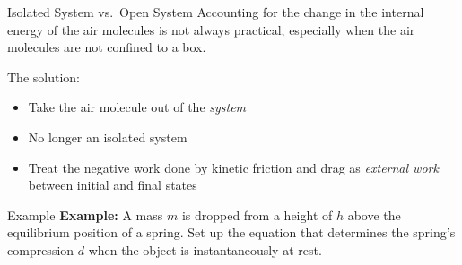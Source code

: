 \documentclass[12pt,compress,aspectratio=169]{beamer}
\begin{document}
\begin{frame}{Isolated System vs.\ Open System}
  Accounting for the change in the internal energy of the air molecules is not
  always practical, especially when the air molecules are not confined to a box.
  \begin{center}
  \end{center}
  The solution:
  \begin{itemize}
  \item Take the air molecule out of the \emph{system}
  \item No longer an isolated system
  \item Treat the negative work done by kinetic friction and drag as
    \emph{external work} between initial and final states

  \end{itemize}
\end{frame}




%
%  
%    



\begin{frame}{Example}
  \textbf{Example:} A mass $m$ is dropped from a height of $h$ above the
  equilibrium position of a spring. Set up the equation that determines the
  spring's compression $d$ when the object is instantaneously at rest.
  \begin{center}
  \end{center}
\end{frame}
\end{document}

